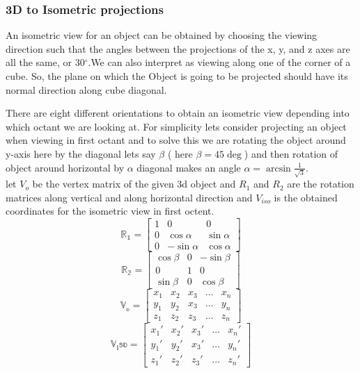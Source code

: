 \subsubsection{3D to Isometric projections}
An isometric view for an object can be obtained by choosing the viewing direction such that the angles between the projections of the x, y, and z axes are all the same, or 30$^\circ$.We can also interpret as viewing along one of the corner of a cube. So, the plane on which the Object is going to be projected should have its normal direction along cube diagonal.\par
There are eight different orientations to obtain an isometric view depending into which octant we are looking at. For simplicity lets consider projecting an object when viewing in first octant and to solve this we are rotating the object around y-axis here by the diagonal lets say $\beta$ ( here $\beta=45\deg $) and then  rotation of object around horizontal by $\alpha$ diagonal makes an angle $\alpha=\arcsin\frac{1}{\sqrt{3}}$.\\
let $V_o$ be the vertex matrix of the given 3d object and $R_1$ and $R_2$ are the rotation matrices along vertical and along horizontal direction and $V_{iso}$ is the obtained coordinates for the isometric view in first octent.
\[
 \mathbb{R_1} =  
 \begin{bmatrix}
    1      & 0 & 0  \\
   0      &\cos\alpha & \sin\alpha   \\
    0      &-\sin\alpha & \cos\alpha  
\end{bmatrix}\] 
\[
 \mathbb{R_2} =  
 \begin{bmatrix}
    \cos\beta      & 0 & -\sin\beta  \\
    0     & 1 & 0   \\
    \sin\beta      &0 & \cos\beta 
\end{bmatrix} \]
\[\mathbb{V_o} =  
 \begin{bmatrix}
    x_{1}       & x_{2} & x_{3}  & \dots & x_{n} \\
    y_{1}       & y_{2} & x_{3}  & \dots & y_{n} \\
    z_{1}       & z_{2} & z_{3}  & \dots & z_{n}
\end{bmatrix}\]
\[
 \mathbb{V_iso} =  
 \begin{bmatrix}
    x_{1}\prime       & x_{2}\prime & x_{3}\prime & \dots & x_{n}\prime \\
    y_{1} \prime      & y_{2}\prime & x_{3}\prime  & \dots & y_{n}\prime \\
    z_{1}\prime       & z_{2}\prime & z_{3}\prime   & \dots & z_{n}\prime
\end{bmatrix}\]
